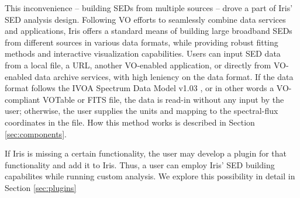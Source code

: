 This inconvenience -- building SEDs from multiple sources -- drove a part of Iris' SED analysis design. Following VO efforts to seamlessly combine data services and applications, Iris offers a standard means of building large broadband SEDs from different sources in various data formats, while providing robust fitting methods and interactive visualization capabilities. Users can input SED data from a local file, a URL, another VO-enabled application, or directly from VO-enabled data archive services, with high leniency on the data format. If the data format follows the IVOA Spectrum Data Model v1.03 \cite{2012arXiv1204.3055M}, or in other words a VO-compliant VOTable or FITS file, the data is read-in without any input by the user; otherwise, the user supplies the units and  mapping to the spectral-flux coordinates in the file. How this method works is described in Section \ref{sec:components}. 

If Iris is missing a certain functionality, the user may develop a plugin for that functionality and add it to Iris. Thus, a user can employ Iris' SED building capabilites while running custom analysis. We explore this possibility in detail in Section \ref{sec:plugins}


%

